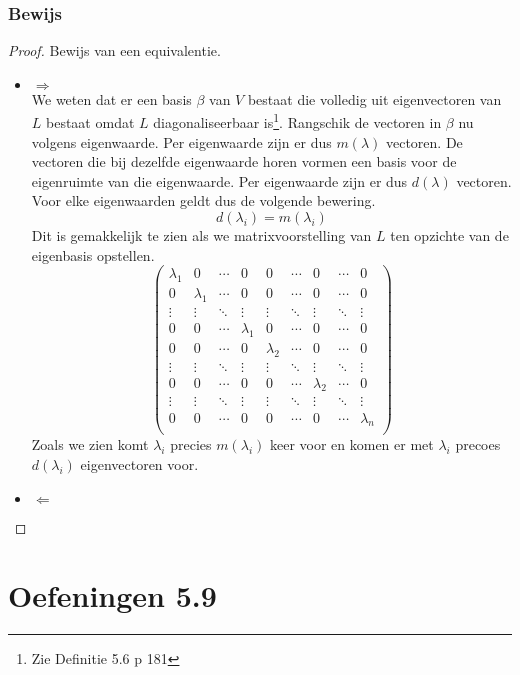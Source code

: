 \documentclass[lineaire_algebra_oplossingen.tex]{subfiles}
\begin{document}
\subsubsection*{Bewijs}
\begin{proof}
Bewijs van een equivalentie.
\begin{itemize}
\item $\Rightarrow$\\
We weten dat er een basis $\beta$ van $V$ bestaat die volledig uit eigenvectoren van $L$ bestaat omdat $L$ diagonaliseerbaar is\footnote{Zie Definitie 5.6 p 181}. Rangschik de vectoren in $\beta$ nu volgens eigenwaarde. Per eigenwaarde zijn er dus $m(\lambda)$ vectoren. De vectoren die bij dezelfde eigenwaarde horen vormen een basis voor de eigenruimte van die eigenwaarde. Per eigenwaarde zijn er dus $d(\lambda)$ vectoren. Voor elke eigenwaarden geldt dus de volgende bewering.
\[
d(\lambda_i) = m(\lambda_i)
\]
Dit is gemakkelijk te zien als we matrixvoorstelling van $L$ ten opzichte van de eigenbasis opstellen.
\[
\begin{pmatrix}
\lambda_1 & 0 & \cdots & 0 & 0 & \cdots & 0 & \cdots & 0\\
0 & \lambda_1 & \cdots & 0 & 0 & \cdots & 0 & \cdots & 0\\
\vdots & \vdots & \ddots & \vdots & \vdots & \ddots&\vdots & \ddots & \vdots\\
0 & 0 & \cdots & \lambda_1& 0 & \cdots   &0 & \cdots & 0\\
0 & 0 & \cdots & 0 & \lambda_2 & \cdots  &0 & \cdots & 0\\
\vdots & \vdots & \ddots & \vdots & \vdots & \ddots & \vdots & \ddots&\vdots\\
0 & 0 & \cdots & 0 & 0 & \cdots & \lambda_2 & \cdots & 0\\
\vdots & \vdots & \ddots & \vdots & \vdots & \ddots & \vdots & \ddots&\vdots\\
0 & 0 & \cdots & 0 & 0 & \cdots & 0 & \cdots & \lambda_n\\
\end{pmatrix}
\]
Zoals we zien komt $\lambda_i$ precies $m(\lambda_i)$ keer voor en komen er met $\lambda_i$ precoes $d(\lambda_i)$ eigenvectoren voor.
\item $\Leftarrow$\\
\end{itemize}
\end{proof}









\section{Oefeningen 5.9}
\end{document}

